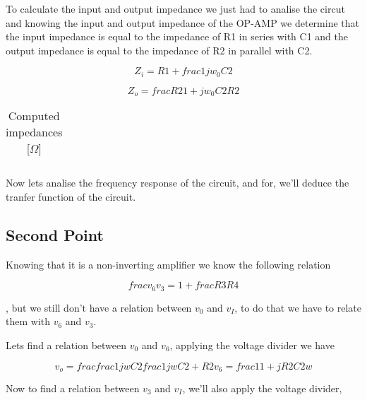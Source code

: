 \par To calculate the input and output impedance we just had to analise the circut and knowing the input and output impedance of the OP-AMP we determine that the input impedance is equal to the impedance of R1 in series with C1 and the output impedance is equal to the impedance of R2 in parallel with C2.

\begin{equation}
	Z_i = R1 + frac{1}{j w_0 C2}
\end{equation}

\begin{equation}
	Z_o = frac{R2}{1 + j w_0 C2 R2}
\end{equation}

\begin{table}[H]
	\centering
	\begin{tabularx}{0.9\textwidth} {
 	    | >{\raggedright\arraybackslash}X
  	    | >{\raggedleft\arraybackslash}X | }
	\hline
	
	\end{tabularx}
	\caption{Computed impedances [$\Omega$]}
	\label{tab:currents}
\end{table}
\vspace{5mm}

\par Now lets analise the frequency response of the circuit, and for, we'll deduce the tranfer function of the circuit.
 
\subsection{Second Point}

\par Knowing that it is a non-inverting amplifier we know the following relation

\begin{equation}
	frac{v_6}{v_3} = 1 + frac{R3}{R4}
\end{equation}

, but we still don't have a relation between $v_0$ and $v_I$, to do that we have to relate them with $v_6$ and $v_3$. 
\par Lets find a relation between $v_0$ and $v_6$, applying the voltage divider we have

\begin{equation}
	v_o = frac{frac{1}{jwC2}}{frac{1}{jwC2 + R2}}v_6 = frac{1}{1 + jR2C2w}
\end{equation}

\par Now to find a relation between $v_3$ and $v_I$, we'll also apply the voltage divider, 

